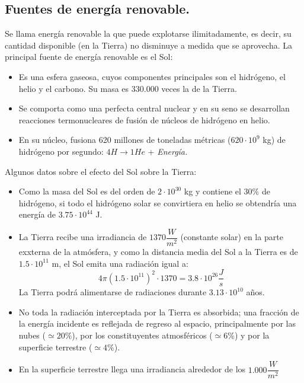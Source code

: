 	\subsection{Fuentes de energía renovable.}
		Se llama energía renovable la que puede explotarse ilimitadamente, es decir, su cantidad disponible (en
		la Tierra) no disminuye a medida que se aprovecha. La principal fuente de energía renovable es el Sol:
		\begin{itemize}
			\item
				Es una esfera gaseosa, cuyos componentes principales son el hidrógeno, el helio y el carbono.
				Su masa es 330.000 veces la de la Tierra.
			\item
				Se comporta como una perfecta central nuclear y en su seno se desarrollan reacciones termonucleares
				de fusión de núcleos de hidrógeno en helio.
			\item
				En su núcleo, fusiona 620 millones de toneladas métricas ($620\cdot10^9$ kg) de hidrógeno por segundo: $4 H\longrightarrow1 He$ + \textit{Energía.}
		\end{itemize}
		
		\indent Algunos datos sobre el efecto del Sol sobre la Tierra:
		\begin{itemize}
			\item
				Como la masa del Sol es del orden de $2\cdot10^{30}$ kg y contiene el 30$\%$ de hidrógeno, si todo el hidrógeno solar se convirtiera en helio se obtendría una energía de $3.75\cdot10^{44}$ J.
			\item 
				La Tierra recibe una irradiancia de $1370 \dfrac{\textit{W}}{\textit{m}^2}$ (constante solar) en la parte exxterna de la atmósfera, y como la distancia media del Sol a la Tierra es de $1.5\cdot10^{11}$ m, el Sol emita una radiación igual a:
				\[4\pi(1.5\cdot10^{11})^{2}\cdot1370 = 3.8\cdot10^{26}\dfrac{\textit{J}}{\textit{s}}\]
				La Tierra podrá alimentarse de radiaciones durante $3.13\cdot10^{10}$ años.
			\item 
				No toda la radiación interceptada por la Tierra es absorbida; una fracción de la energía incidente es reflejada
				de regreso al espacio, principalmente por las nubes ($\simeq20\%$), por los constituyentes atmosféricos ($\simeq6\%$) y por la superficie terrestre ($\simeq4\%$).
			\item 
				En la superficie terrestre llega una irradiancia alrededor de los $1.000 \dfrac{\textit{W}}{\textit{m}^2}$
		\end{itemize}
			
